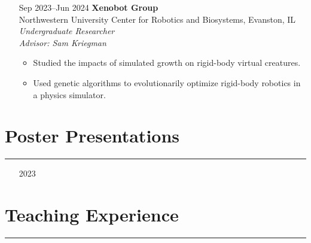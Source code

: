 \documentclass{article}
\begin{document}
\begin{itemize}[leftmargin=1.5in]
    \item[Sep 2023–Jun 2024] \textbf{Xenobot Group}\\
     Northwestern University Center for Robotics and Biosystems, Evanston, IL\\
    \textit{Undergraduate Researcher}\\
    \textit{Advisor: Sam Kriegman}
    \begin{itemize}
        \item Studied the impacts of simulated growth on rigid-body virtual creatures.
        \item Used genetic algorithms to evolutionarily optimize rigid-body robotics in a physics simulator.
    \end{itemize}
\end{itemize}

\section*{Poster Presentations}
\hrule
\vspace{10pt}

\begin{itemize}[leftmargin=1.5in]
    \item[2023] 
\end{itemize}

\section*{Teaching Experience}
\hrule
\vspace{10pt}
\end{document}
